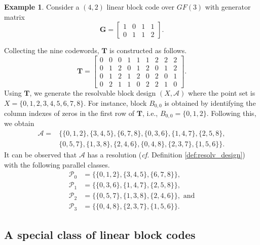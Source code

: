 \documentclass[journal,twocolumn]{IEEEtran}
\theoremstyle{definition}
\newtheorem{example}{Example}
\newcommand{\calA}{\mathcal{A}}
\newcommand{\calP}{\mathcal{P}}
\newcommand{\bfT}{\mathbf{T}}
\newcommand{\bfG}{\mathbf{G}}
\begin{document}
\begin{example}
 	\label{eg:resolv_q_3_k_2}
 	Consider a $(4,2)$ linear block code over $GF(3)$ with generator matrix
 	$$
 	\bfG=\begin{bmatrix}
 	1&0&1&1\\
 	0&1&1&2
 	\end{bmatrix}.
 	$$
 	
 	Collecting the nine codewords, $\bfT$ is constructed as follows.
 	$$
 	\bfT=
 	\begin{bmatrix}
 	0&0&0&1&1&1&2&2&2\\
 	0&1&2&0&1&2&0&1&2\\
 	0&1&2&1&2&0&2&0&1\\
 	0&2&1&1&0&2&2&1&0
 	\end{bmatrix}.
 	$$
 	Using $\bfT$, we generate the resolvable block design $(X,\calA)$ where
 	the point set is $X=\{0,1,2,3,4,5,6,7,8\}$. For instance, block $B_{0,0}$ is obtained by identifying the column indexes of zeros in the first row of $\bfT$, i.e., $B_{0,0}=\{0,1,2\}$. Following this, we obtain
 	\begin{align*}
 	\calA=&\{\{0,1,2\},\{3,4,5\},\{6,7,8\},\{0,3,6\},\{1,4,7\},\{2,5,8\},\\
 	&\{0,5,7\}, \{1,3,8\},\{2,4,6\},\{0,4,8\},\{2,3,7\},\{1,5,6\}\}.
 	\end{align*}
 	It can be observed that $\calA$ has a resolution ({\it cf.} Definition \ref{def:resolv_design}) with the following parallel classes.
 	\begin{align*}
 	\calP_0 &=\{\{0,1,2\},\{3,4,5\},\{6,7,8\}\},\\
 	\calP_1 &=\{\{0,3,6\},\{1,4,7\},\{2,5,8\}\},\\
 	\calP_2 &=\{\{0,5,7\},\{1,3,8\},\{2,4,6\}\}, \text{~and}\\
 	\calP_3 &=\{\{0,4,8\},\{2,3,7\},\{1,5,6\}\}.
 	\end{align*}
 \end{example}
%
%

\subsection{A special class of linear block codes}
\end{document}
